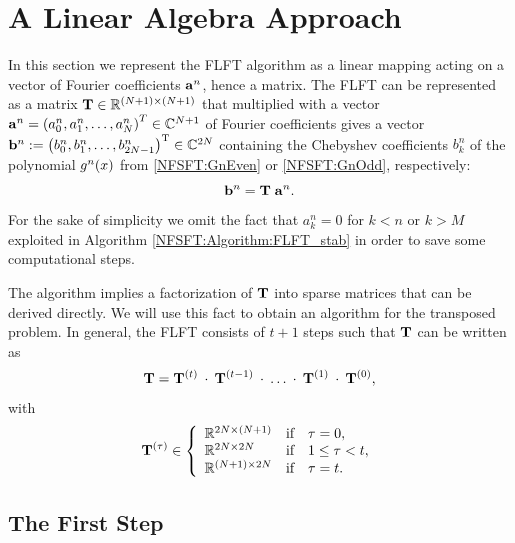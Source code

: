 \section{A Linear Algebra Approach}
\label{DSFT:LinearAlgebra}

In this section we represent the FLFT algorithm as a linear mapping acting on a vector of Fourier coefficients $\mathbf{a}^n$, hence a matrix. 
The FLFT can be represented as a matrix $\mathbf{T} \in \mathbb{R}^{(N+1) \times (N+1)}$ that multiplied with a vector $\mathbf{a}^n = \left(a_0^n,a_1^n,\dots,a_N^n\right)^T \in \mathbb{C}^{N+1}$ of Fourier coefficients gives a vector $\mathbf{b}^n := \left(b_0^n,b_1^n,\dots,b_{2N-1}^n\right)^{\text{\rm{T}}} \in \mathbb{C}^{2N}$ containing the Chebyshev coefficients $b_{k}^n$ of the polynomial $g^n{\hspace{-0.4ex}}\left(x\right)$ from \eqref{NFSFT:GnEven} or \eqref{NFSFT:GnOdd}, respectively: 
$$\mathbf{b}^{n} = \mathbf{T} \; \mathbf{a}^n.$$ 
For the sake of simplicity we omit the fact that $a_{k}^n = 0$ for $k < n$ or $k > M$ exploited in Algorithm \ref{NFSFT:Algorithm:FLFT_stab} in order to save some computational steps.

The algorithm implies a factorization of $\mathbf{T}$ into sparse matrices that can be derived directly.
We will use this fact to obtain an algorithm for the transposed problem. In general, the FLFT consists of $t+1$ steps such that $\mathbf{T}$ can be written as 
$$
  \mathbf{T} = \mathbf{T}^{(t)} \: \cdot \:  \mathbf{T}^{(t-1)} \: \cdot \: \dots \: \cdot \: \mathbf{T}^{(1)} \: \cdot \:  \mathbf{T}^{(0)},
$$
with
$$
 \V{T}^{(\tau)} \in \left\{\begin{array}{l@{\quad \text{if} \quad}l} \R^{2N \times (N+1)} & \tau = 0, \\ \R^{2N \times 2N} & 1 \le \tau < t, \\ \R^{(N+1) \times 2N} & \tau = t. \end{array}\right.
$$

\subsection{The First Step}

